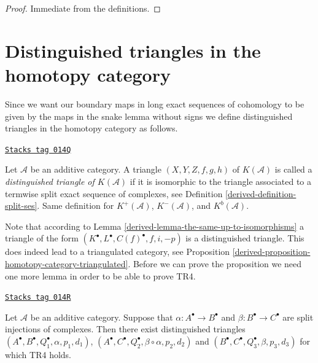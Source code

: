 \begin{proof}
Immediate from the definitions.
\end{proof}

\section{Distinguished triangles in the homotopy category}
\label{derived-section-homotopy-triangulated}
Since we want our boundary maps in long exact sequences of cohomology
to be given by the maps in the snake lemma without signs we define
distinguished triangles in the homotopy category as follows.

\begin{definition}
\label{derived-definition-distinguished-triangle}
\href{https://stacks.math.columbia.edu/tag/014Q}{\texttt{Stacks tag 014Q}}

Let $\mathcal{A}$ be an additive category.
A triangle $(X, Y, Z, f, g, h)$ of $K(\mathcal{A})$ is
called a {\it distinguished triangle of $K(\mathcal{A})$}
if it is isomorphic to the triangle associated to
a termwise split exact sequence of complexes, see Definition
\ref{derived-definition-split-ses}.
Same definition for $K^{+}(\mathcal{A})$, $K^{-}(\mathcal{A})$, and
$K^b(\mathcal{A})$.
\end{definition}

Note that according to Lemma \ref{derived-lemma-the-same-up-to-isomorphisms}
a triangle of the form $(K^\bullet, L^\bullet, C(f)^\bullet, f, i, -p)$
is a distinguished triangle.
This does indeed lead to a triangulated category, see
Proposition \ref{derived-proposition-homotopy-category-triangulated}.
Before we can prove the proposition we need one more lemma
in order to be able to prove TR4.

\begin{lemma}
\label{derived-lemma-two-split-injections}
\href{https://stacks.math.columbia.edu/tag/014R}{\texttt{Stacks tag 014R}}

Let $\mathcal{A}$ be an additive category. Suppose that
$\alpha : A^\bullet \to B^\bullet$ and $\beta : B^\bullet \to C^\bullet$
are split injections of complexes. Then there exist distinguished triangles
$(A^\bullet, B^\bullet, Q_1^\bullet, \alpha, p_1, d_1)$,
$(A^\bullet, C^\bullet, Q_2^\bullet, \beta \circ \alpha, p_2, d_2)$
and
$(B^\bullet, C^\bullet, Q_3^\bullet, \beta, p_3, d_3)$
for which TR4 holds.
\end{lemma}

